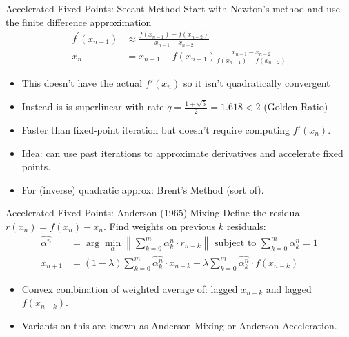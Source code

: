 \begin{frame}{Accelerated Fixed Points: Secant Method}
Start with Newton's method and use the finite difference approximation
\begin{align*}
f^{\prime}\left(x_{n-1}\right)  &\approx \frac{f\left(x_{n-1}\right)-f\left(x_{n-2}\right)}{x_{n-1}-x_{n-2}} \\
x_{n}&=x_{n-1}-f\left(x_{n-1}\right) \frac{x_{n-1}-x_{n-2}}{f\left(x_{n-1}\right)-f\left(x_{n-2}\right)}
\end{align*}
\begin{itemize}
\item This doesn't have the actual $f'(x_n)$ so it isn't quadratically convergent
\item Instead is is superlinear with rate $q = \frac{1 + \sqrt{5}}{2}=1.618 < 2$ (Golden Ratio)
\item Faster than fixed-point iteration but doesn't require computing $f'(x_n)$.
\item Idea: can use past iterations to approximate derivatives and accelerate fixed points.
\item For (inverse) quadratic approx: \alert{Brent's Method} (sort of).
\end{itemize}
\end{frame}

\begin{frame}{Accelerated Fixed Points: Anderson (1965) Mixing}
Define the residual $r(x_n) = f(x_n) - x_n$. Find weights on previous $k$ residuals:
\begin{align*}
\widehat{\alpha^{n}} &= \arg \min_{\alpha} \left\|\sum_{k=0}^{m} \alpha_{k}^{n} \cdot r_{n-k}\right\| \text { subject to } \sum_{k=0}^{m} \alpha_{k}^{n}=1\\
x_{n+1}&=\left(1-\lambda\right) \sum_{k=0}^{m} \widehat{\alpha_{k}^{n}}\cdot x_{n-k}+\lambda \sum_{k=0}^{m}\widehat{\alpha_{k}^{n}}\cdot f\left(x_{n-k}\right)
\end{align*}
\begin{itemize}
\item Convex combination of weighted average of: lagged $x_{n-k}$ and lagged $f(x_{n-k})$.
\item Variants on this are known as \alert{Anderson Mixing} or \alert{Anderson Acceleration}.
\end{itemize}
\end{frame}

